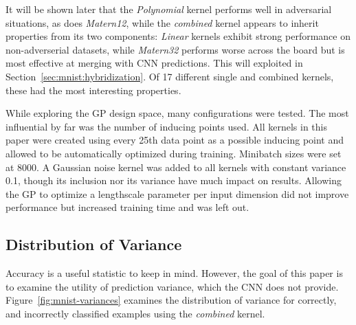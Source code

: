 \documentclass{article}
\begin{document}


It will be shown later that the \textit{Polynomial} kernel performs well in adversarial situations, as does \textit{Matern12}, while the \textit{combined} kernel appears to inherit properties from its two components: \textit{Linear} kernels exhibit strong performance on non-adverserial datasets, while \textit{Matern32} performs worse across the board but is most effective at merging with CNN predictions. This will exploited in  Section~\ref{sec:mnist:hybridization}. Of 17 different single and combined kernels, these had the most interesting properties.

While exploring the GP design space, many configurations were tested. The most influential by far was the number of inducing points used. All kernels in this paper were created using every 25th data point as a possible inducing point and allowed to be automatically optimized during training. Minibatch sizes were set at 8000. A Gaussian noise kernel was added to all kernels with constant variance 0.1, though its inclusion nor its variance have much impact on results. Allowing the GP to optimize a lengthscale parameter per input dimension did not improve performance but increased training time and was left out.



\subsection{Distribution of Variance}

Accuracy is a useful statistic to keep in mind. However, the goal of this paper is to examine the utility of prediction variance, which the CNN does not provide. Figure~\ref{fig:mnist-variances} examines the distribution of variance for correctly, and incorrectly classified examples using the \textit{combined} kernel.
\end{document}
